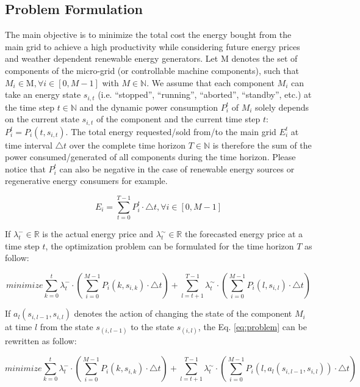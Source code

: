 \subsection{Problem Formulation}
The main objective is to minimize the total cost the energy bought from the main grid to achieve a high productivity while considering future energy prices and weather dependent renewable energy generators. Let $\mathrm{M}$ denotes the set of components of the micro-grid (or controllable machine components), such that $M_i \in \mathrm{M}, \forall i \in [0, M-1]$  with $ M \in \mathbb{N}$. We assume that each component $M_i$ can take an energy state $s_{i,t}$ (i.e. “stopped”, “running”, “aborted”, “standby”, etc.) at the time step $t  \in \mathbb{N}$ and the dynamic power consumption $P_i^t$ of $M_i$ solely depends on the current state $s_{i,t}$ of the component and the current time step $t$: $P_i^t=P_i (t, s_{i,t})$. The total energy requested/sold from/to the main grid $E_i^t$ at time interval $\triangle t$ over the complete time horizon $T \in \mathbb{N}$ is therefore the sum of the power consumed/generated of all components during the time horizon. Please notice that $P_i^t$ can also be negative in the case of renewable energy sources or regenerative energy consumers for example.

%
\begin{equation}
E_i =\sum_{t=0}^{T-1}{ P_i^t \cdot \triangle t}, \forall i \in [0, M-1]
\end{equation}
%

 If $\lambda_t^- \in \mathbb{R}$ is the actual energy price and $\lambda_t^\sim \in \mathbb{R}$ the forecasted energy price at a time step $t$, the optimization problem can be formulated for the time horizon $T$ as follow:

%
\begin{equation}
\label{eq:problem}
minimize \sum_{k=0}^{t}{ {\lambda_t^-} \cdot ({ \sum_{i=0}^{M-1}{ P_i (k, s_{i,k}) \cdot \triangle t } })}+  \sum_{l=t+1}^{T-1}{\lambda_t^\sim \cdot ({ \sum_{i=0}^{M-1}{ P_i (l, s_{i,l}) \cdot \triangle t  } }) }
\end{equation}

If $a_l (s_{i,l-1},s_{i,l})$ denotes the action of changing the state of the component $M_i$ at time $l$ from the state $s_(i,l-1)$ to the state $s_(i,l)$, the Eq. \ref{eq:problem} can be rewritten as follow:

\begin{equation}
\label{eq:problem_reformulated}
minimize \sum_{k=0}^{t}{ {\lambda_t^-} \cdot ({ \sum_{i=0}^{M-1}{ P_i (k, s_{i,k}) \cdot \triangle t } })}+  \sum_{l=t+1}^{T-1}{\lambda_t^\sim \cdot ({ \sum_{i=0}^{M-1}{ P_i (l, a_l (s_{i,l-1},s_{i,l})) \cdot \triangle t  } }) }
\end{equation}

